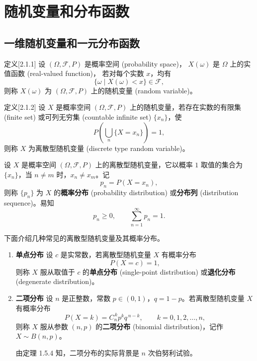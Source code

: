 \chapter{随机变量和分布函数}
\section{一维随机变量和一元分布函数}
\begin{definition}[随机变量]定义[2.1.1]
设 $(\Omega, \mathscr{F}, P)$ 是概率空间 (probability space)，
$X(\omega)$ 是 $\Omega$ 上的实值函数 (real-valued function)，
若对每个实数 $x$，均有
\[
\{\omega \mid X(\omega) < x\} \in \mathscr{F},
\]
则称 $X(\omega)$ 为 $(\Omega, \mathscr{F}, P)$ 上的随机变量 (random variable)。
\end{definition}
\begin{definition}[离散型随机变量]定义[2.1.2]
设 $X$ 是概率空间 $(\Omega, \mathscr{F}, P)$ 上的随机变量，若存在实数的有限集 (finite set) 或可列无穷集 (countable infinite set) $\{x_n\}$，使
\[
P\!\left(\bigcup_{n}\{X = x_n\}\right) = 1,
\]
则称 $X$ 为离散型随机变量 (discrete type random variable)。
\end{definition}
\begin{definition}[分布列]
设 $X$ 是概率空间 $(\Omega,\mathcal{F},P)$ 上的离散型随机变量，它以概率 $1$ 取值的集合为 $\{x_n\}$，当 $n\ne m$ 时，$x_n \ne x_m$。记
\[
p_n = P(X = x_n),
\]
则称 $\{p_n\}$ 为 $X$ 的\textbf{概率分布} (probability distribution) 或\textbf{分布列} (distribution sequence)。易知
\[
p_n \geq 0, \qquad \sum_{n=1}^{\infty} p_n = 1.
\]
\end{definition}
下面介绍几种常见的离散型随机变量及其概率分布。

\begin{enumerate}
  \item \textbf{单点分布}  
  设 $c$ 是实常数，若离散型随机变量 $X$ 有概率分布
  \[
  P(X=c)=1,
  \]
  则称 $X$ 服从取值于 $c$ 的\textbf{单点分布} (single-point distribution) 或\textbf{退化分布} (degenerate distribution)。

  \item \textbf{二项分布}  
  设 $n$ 是正整数，常数 $p\in(0,1)$，$q=1-p$。若离散型随机变量 $X$ 有概率分布
  \[
  P(X=k)=C_{n}^{\,k} p^{k} q^{\,n-k}, \qquad k=0,1,2,\dots,n, \tag{2.1.1}
  \]
  则称 $X$ 服从参数 $(n,p)$ 的\textbf{二项分布} (binomial distribution)，记作 $X\sim B(n,p)$。  

  由定理 1.5.4 知，二项分布的实际背景是 $n$ 次伯努利试验。
\end{enumerate}

